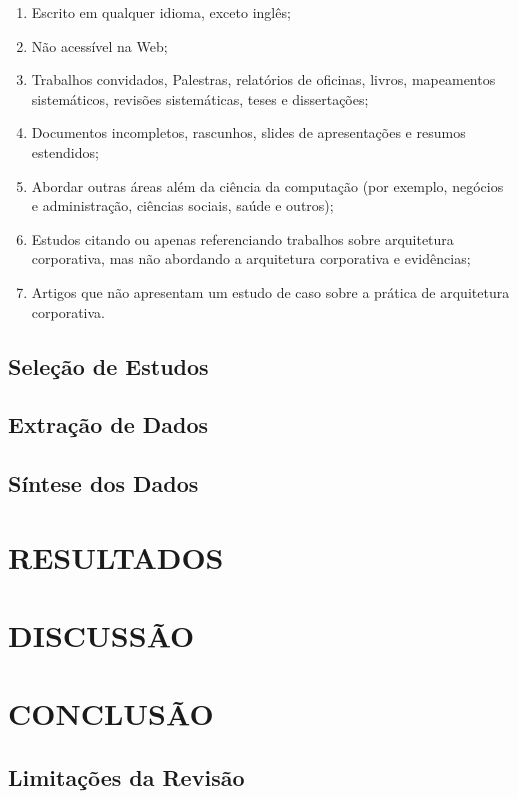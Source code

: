 \begin{enumerate}
    \item Escrito em qualquer idioma, exceto inglês;
    \item Não acessível na Web;
    \item Trabalhos convidados, Palestras, relatórios de oficinas, livros, mapeamentos sistemáticos, revisões sistemáticas, teses e dissertações;
    \item Documentos incompletos, rascunhos, slides de apresentações e resumos estendidos; 
    \item Abordar outras áreas além da ciência da computação (por exemplo, negócios e administração, ciências sociais, saúde e outros);
    \item Estudos citando ou apenas referenciando trabalhos sobre arquitetura corporativa, mas não abordando a arquitetura corporativa e evidências;
    \item Artigos que não apresentam um estudo de caso sobre a prática de arquitetura corporativa.
\end{enumerate}

\subsection{Seleção de Estudos}
\subsection{Extração de Dados}
\subsection{Síntese dos Dados}

\section{RESULTADOS}


\section{DISCUSSÃO}

\section{CONCLUSÃO}
\subsection{Limitações da Revisão}

